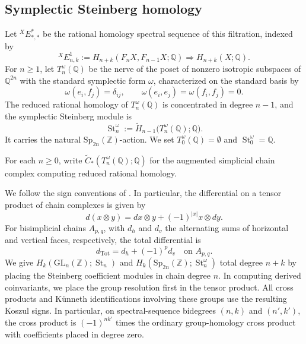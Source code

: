 \documentclass[12 pt]{amsart}
\newcommand{\QQ}{\mathbb{Q}}
\newcommand{\ZZ}{\mathbb{Z}}
\newcommand{\EX}{{}^{X}\!E}
\newcommand{\Sp}{\mathrm{Sp}}
\newcommand{\St}{\operatorname{St}}
\newcommand{\Tot}{\operatorname{Tot}}
\newcommand{\GL}{\mathrm{GL}}
\newcommand{\<}{\langle}
\renewcommand{\>}{\rangle}
\theoremstyle{definition}
\begin{document}
\subsection{Symplectic Steinberg homology}\label{sec:symplectic-S-homology}

Let $\EX^*_{*, *}$ be the rational homology spectral sequence of this filtration, indexed by
\[
\EX^1_{n, k} := H_{n + k}(F_n X, F_{n - 1} X; \QQ) \Longrightarrow H_{n + k}(X; \QQ).
\]
For $n \geq 1$, let $T^\omega_n(\QQ)$ be the nerve of the poset of nonzero isotropic subspaces of $\QQ^{2n}$ with the standard symplectic form $\omega$, characterized on the standard basis by
\[
\omega(e_i, f_j) = \delta_{ij}, \qquad \omega(e_i, e_j) = \omega(f_i, f_j) = 0.
\]
The reduced rational homology of $T_n^\omega(\QQ)$ is concentrated in degree $n - 1$, and the symplectic Steinberg module is
\[
\St_n^\omega := \widetilde H_{n - 1}\bigl(T_n^\omega(\QQ); \QQ\bigr).
\]
It carries the natural $\Sp_{2n}(\ZZ)$-action. We set $T_0^\omega(\QQ) = \emptyset$ and $\St_0^\omega = \QQ$.

For each $n \geq 0$, write $\widetilde C_*(T_n^\omega(\QQ); \QQ)$ for the augmented simplicial chain complex computing reduced rational homology. 

We follow the sign conventions of \cite[\S\S2.7 and~8.5]{Weibel}. In particular, the differential on a tensor product of chain complexes is given by $$d(x \otimes y) = dx \otimes y + (-1)^{|x|} x \otimes dy.$$ For bisimplicial chains $A_{p, q}$, with $d_h$ and $d_v$ the alternating sums of horizontal and vertical faces, respectively, the total differential is
\[
d_{\Tot} = d_h + (-1)^p d_v \quad \mbox{on } A_{p, q}.
\]
We give $H_k(\GL_n(\ZZ); \St_n)$ and $H_k(\Sp_{2n}(\ZZ); \St_n^\omega)$ total degree $n + k$ by placing the Steinberg coefficient modules in chain degree $n$. In computing derived coinvariants, we place the group resolution first in the tensor product. All cross products and K\"unneth identifications involving these groups use the resulting Koszul signs. In particular, on spectral-sequence bidegrees $(n, k)$ and $(n', k')$, the cross product is $(-1)^{nk'}$ times the ordinary group-homology cross product with coefficients placed in degree zero.
\end{document}
